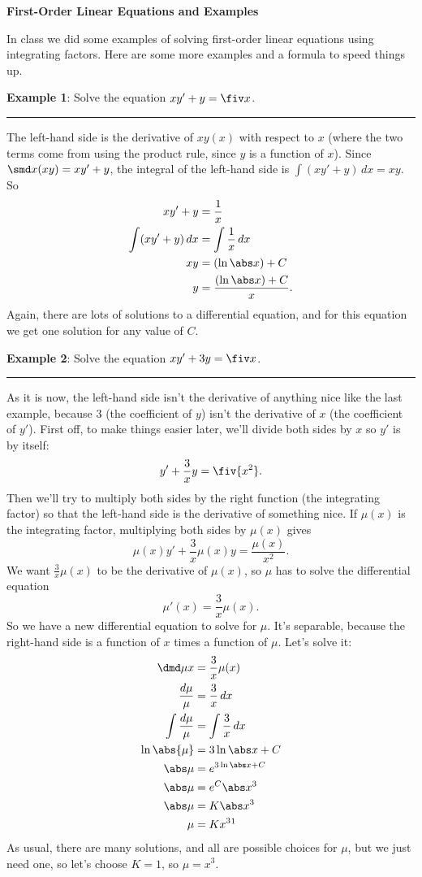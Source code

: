 \documentclass[11pt]{letter}
\begin{document}
\textbf{First-Order Linear Equations and Examples}

In class we did some examples of solving first-order linear equations using integrating factors. Here are some more examples and a formula to speed things up.

\textbf{Example 1}: Solve the equation $xy' + y = \fiv x$.
\hrule

The left-hand side is the derivative of $xy(x)$ with respect to $x$ (where the two terms come from using the product rule, since $y$ is a function of $x$). Since $\smd x(xy)=xy'+y$, the integral of the left-hand side is $\int (xy'+y)\,dx=xy$. So
\begin{align*}
	xy' + y &= \frac 1x\\
	\int (xy'+y)\,dx &= \int \frac 1x\,dx\\
	xy &= (\ln \abs x)+C\\
	y &= \frac{(\ln\abs x)+C}{x}.
\end{align*}
Again, there are lots of solutions to a differential equation, and for this equation we get one solution for any value of $C$.

\textbf{Example 2}: Solve the equation $xy' + 3y = \fiv x$.
\hrule

As it is now, the left-hand side isn't the derivative of anything nice like the last example, because $3$ (the coefficient of $y$) isn't the derivative of $x$ (the coefficient of $y'$). First off, to make things easier later, we'll divide both sides by $x$ so $y'$ is by itself:
\[
y' + \frac 3x y = \fiv{x^2}.
\]
Then we'll try to multiply both sides by the right function (the integrating factor) so that the left-hand side is the derivative of something nice. If $\mu(x)$ is the integrating factor, multiplying both sides by $\mu(x)$ gives
\[
\mu(x) y' + \frac{3}{x}\mu(x) y = \frac{\mu(x)}{x^2}.
\]
We want $\frac{3}{x}\mu (x)$ to be the derivative of $\mu(x)$, so $\mu$ has to solve the differential equation
\[
\mu'(x) = \frac{3}{x}\mu(x).
\]
So we have a new differential equation to solve for $\mu$. It's separable, because the right-hand side is a function of $x$ times a function of $\mu$. Let's solve it:
\begin{align*}
\dmd \mu x &= \frac{3}{x}\mu(x)\\
\frac{d\mu}{\mu} &= \frac{3}{x}\,dx\\
\int\frac{d\mu}{\mu} &= \int\frac{3}{x}\,dx\\
\ln\abs{\mu} &= 3\ln\abs x+C\\
\abs\mu &= e^{3\ln\abs x+C}\\
\abs\mu &= e^C\abs x^3\\
\abs\mu &= K\abs x^3\\
\mu &= Kx^3
\footnotemark
\end{align*}
As usual, there are many solutions, and all are possible choices for $\mu$, but we just need one, so let's choose $K=1$, so $\mu=x^3$.
\end{document}
